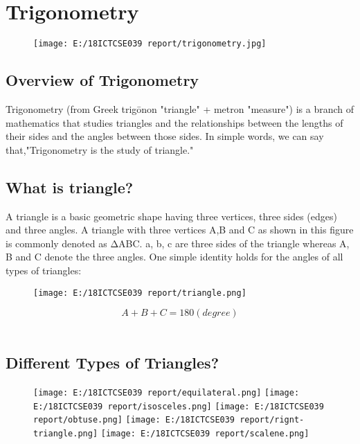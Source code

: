 \documentclass{article}
\begin{document}
\section{Trigonometry}
\begin{figure}[H]
\texttt{[image: E:/18ICTCSE039 report/trigonometry.jpg]}
\end{figure}

\subsection{Overview of Trigonometry}
Trigonometry (from Greek trigōnon "triangle" + metron "measure") is a branch of mathematics that studies triangles and the relationships between the lengths of their sides and the angles between those sides.
\newline \newline
In simple words, we can say that,"Trigonometry is the study of triangle."
\subsection{What is triangle?}
A triangle is a basic geometric shape having three vertices, three sides (edges) and three angles.
\newline \newline
A triangle with three vertices A,B and C as shown in this figure is commonly denoted as ΔABC. a, b, c are three sides of the triangle whereas A, B and C denote the three angles. One simple identity holds for the angles of all types of triangles:
\begin{figure}[H]
\texttt{[image: E:/18ICTCSE039 report/triangle.png]}
\end{figure}
$$A+B+C=180(degree)$$\\
\subsection{Different Types of Triangles?}
\begin{figure}[H]

\texttt{[image: E:/18ICTCSE039 report/equilateral.png]}
\texttt{[image: E:/18ICTCSE039 report/isosceles.png]}
\texttt{[image: E:/18ICTCSE039 report/obtuse.png]}
\texttt{[image: E:/18ICTCSE039 report/rignt-triangle.png]}
\texttt{[image: E:/18ICTCSE039 report/scalene.png]}
\end{figure}

\newpage
\end{document}

